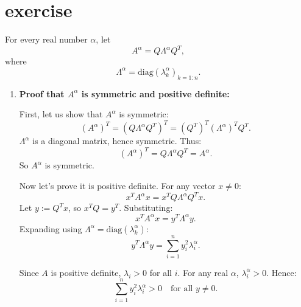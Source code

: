 \documentclass{article}
\begin{document}
\section{exercise}
For every real number $\alpha$, let
\[
    A^\alpha = Q \Lambda^\alpha Q^T,
\]
where
\[
    \Lambda^\alpha = \text{diag}(\lambda_k^\alpha)_{k=1:n}.
\]
\begin{enumerate}
    \item \textbf{Proof that $A^\alpha$ is symmetric and positive definite:}

          First, let us show that $A^\alpha$ is symmetric:
          \[
              (A^\alpha)^T = (Q \Lambda^\alpha Q^T)^T = (Q^T)^T (\Lambda^\alpha)^T Q^T.
          \]
          $\Lambda^\alpha$ is a diagonal matrix, hence symmetric. Thus:
          \[
              (A^\alpha)^T = Q \Lambda^\alpha Q^T = A^\alpha.
          \]
          So $A^\alpha$ is symmetric.

          Now let's prove it is positive definite. For any vector $x\neq0$:
          \[
              x^T A^\alpha x = x^T Q \Lambda^\alpha Q^T x.
          \]
          Let $y := Q^T x$, so $x^T Q = y^T$. Substituting:
          \[
              x^T A^\alpha x = y^T \Lambda^\alpha y.
          \]
          Expanding using $\Lambda^\alpha = \text{diag}(\lambda_k^\alpha)$:
          \[
              y^T \Lambda^\alpha y = \sum_{i=1}^n y_i^2 \lambda_i^\alpha.
          \]

          Since $A$ is positive definite, $\lambda_i > 0$ for all $i$. For any real $\alpha$, $\lambda_i^\alpha > 0$. Hence:
          \[
              \sum_{i=1}^n y_i^2 \lambda_i^\alpha > 0 \quad \text{for all } y \neq 0.
          \]


\end{enumerate}
\end{document}
